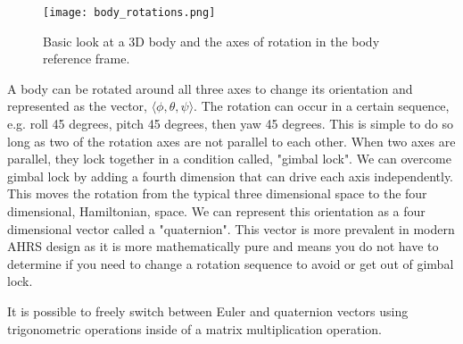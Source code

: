 \begin{figure}[h!]
    \caption[Body rotations]{Basic look at a 3D body and the axes of rotation in the body reference frame.}
    \label{fig:body_rotations}
    \centering
    \texttt{[image: body\_rotations.png]}
\end{figure}

A body can be rotated around all three axes to change its orientation and represented as the vector, $\langle\phi, \theta, \psi\rangle$.
The rotation can occur in a certain sequence, e.g. roll 45 degrees, pitch 45 degrees, then yaw 45 degrees.
This is simple to do so long as two of the rotation axes are not parallel to each other.
When two axes are parallel, they lock together in a condition called, "gimbal lock". 
We can overcome gimbal lock by adding a fourth dimension that can drive each axis independently.
This moves the rotation from the typical three dimensional space to the four dimensional, Hamiltonian, space.
We can represent this orientation as a four dimensional vector called a "quaternion".
This vector is more prevalent in modern AHRS design as it is more mathematically pure and means you do not have to determine if you need to change a rotation sequence to avoid or get out of gimbal lock.

It is possible to freely switch between Euler and quaternion vectors using trigonometric operations inside of a matrix multiplication operation.

